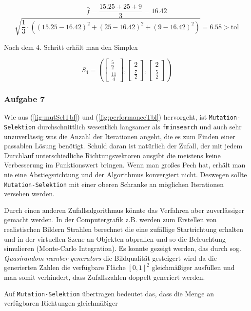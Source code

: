 \documentclass[a4paper, 12pt]{report}
\begin{document}
$$\bar f = \frac{15.25+25+9}{3} = 16.42$$
$$\sqrt{\frac{1}{3}\cdot \left((15.25 - 16.42)^2 + (25 - 16.42)^2 + (9 - 16.42)^2\right)} = 6.58 > \text{tol}$$

Nach dem 4. Schritt erhält man den Simplex

$$S_4 = \left(\begin{bmatrix}\frac{5}{2}\\\frac{11}{4}\end{bmatrix}, \begin{bmatrix}2\\\frac{7}{2}\end{bmatrix}, \begin{bmatrix}2\\\frac{5}{2}\end{bmatrix}\right)$$

\subsubsection{Aufgabe 7}
Wie aus (\autoref{fig:mutSelTbl}) und (\autoref{fig:performanceTbl}) hervorgeht, ist \lstinline[basicstyle=\ttfamily\color{black}]|Mutation-Selektion|
durchschnittlich wesentlich langsamer als \lstinline[basicstyle=\ttfamily\color{black}]|fminsearch| und auch sehr unzuverlässig was die Anzahl der
Iterationen angeht, die es zum Finden einer passablen Lösung benötigt. Schuld daran ist natürlich der Zufall, der mit jedem Durchlauf unterschiedliche
Richtungsvektoren ausgibt die meistens keine Verbesserung im Funktionswert bringen. Wenn man großes Pech hat, erhält man nie eine Abstiegsrichtung und der
Algorithmus konvergiert nicht. Deswegen sollte \lstinline[basicstyle=\ttfamily\color{black}]|Mutation-Selektion| mit einer oberen Schranke an möglichen
Iterationen versehen werden.\par
Durch einen anderen Zufallsalgorithmus könnte das Verfahren aber zuverlässiger gemacht werden. In der Computergrafik z.B. werden zum Erstellen von
realistischen Bildern Strahlen berechnet die eine zufällige Startrichtung erhalten und in der virtuellen Szene an Objekten abprallen und so
die Beleuchtung simulieren (Monte-Carlo Integration). Es konnte gezeigt werden, das durch sog. \textit{Quasirandom number generators}
die Bildqualität gesteigert wird da die generierten Zahlen die verfügbare Fläche $[0, 1]^2$ gleichmäßiger ausfüllen und man somit verhindert, dass
Zufallszahlen doppelt generiert werden.\par
Auf \lstinline[basicstyle=\ttfamily\color{black}]|Mutation-Selektion| übertragen bedeutet das, dass die Menge an verfügbaren Richtungen gleichmäßiger
\end{document}
